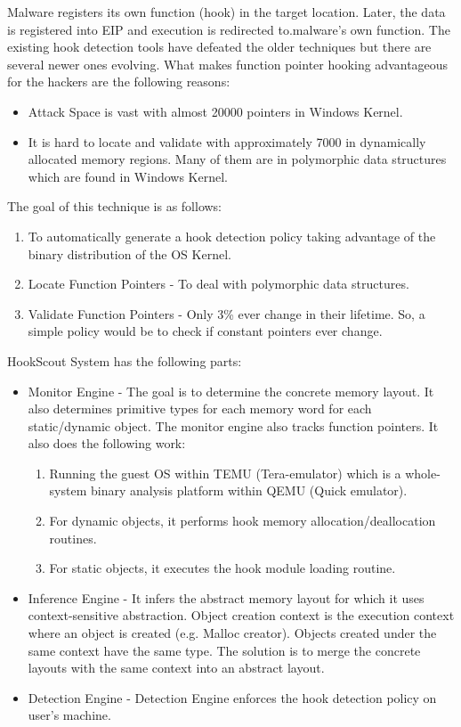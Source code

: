\documentclass[11pt]{article}
\begin{document}
	Malware registers its own function (hook) in the target location. Later, the data is registered into EIP and execution is redirected to.malware’s own function. The existing hook detection tools have defeated the older techniques but there are several newer ones evolving. What makes function pointer hooking advantageous for the hackers are the following reasons:
	\begin{itemize}
		\item Attack Space is vast with almost 20000 pointers in Windows Kernel.
		\item It is hard to locate and validate with approximately 7000 in dynamically allocated memory regions. Many of them are in polymorphic data structures which are found in Windows Kernel.
	\end{itemize}
	The goal of this technique is as follows: 
	\begin{enumerate}
		\item To automatically generate a hook detection policy taking advantage of the binary distribution of the OS Kernel.
		\item Locate Function Pointers - To deal with polymorphic data structures.
		\item Validate Function Pointers - Only 3\% ever change in their lifetime. So, a simple policy would be to check if constant pointers ever change.
	\end{enumerate}
	HookScout System has the following parts:
	\begin{itemize}
		\item Monitor Engine - The goal is to determine the concrete memory layout. It also determines primitive types for each memory word for each static/dynamic object. The monitor engine also tracks function pointers. It also does the following work:
		\begin{enumerate}
			\item Running the guest OS within TEMU (Tera-emulator) which is a whole-system binary analysis platform within QEMU (Quick emulator).
			\item For dynamic objects, it performs hook memory allocation/deallocation routines.
			\item For static objects, it executes the hook module loading routine.
		\end{enumerate}
		\item Inference Engine - It infers the abstract memory layout for which it uses context-sensitive abstraction. Object creation context is the execution context where an object is created (e.g. Malloc creator). Objects created under the same context have the same type. The solution is to merge the concrete layouts with the same context into an abstract layout.
		\item Detection Engine - Detection Engine enforces the hook detection policy on user’s machine. 
	\end{itemize}
\end{document}
